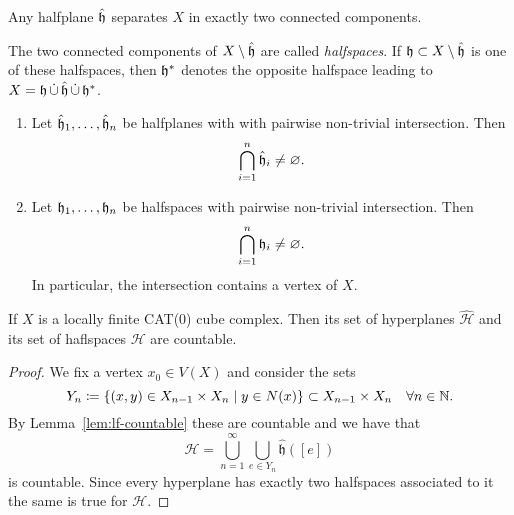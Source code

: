 \begin{thm}
  Any halfplane \(\mathfrak{\hat h}\) separates \(X\) in exactly two connected components.
\end{thm}

\begin{defin}
  The two connected components of \(X \setminus \mathfrak{\hat h}\) are called \emph{halfspaces}. If \(\mathfrak{h} \subset X \setminus \mathfrak{\hat h}\) is one of these halfspaces, then \(\mathfrak{h}^\ast\) denotes the opposite halfspace leading to \(X = \mathfrak{h}\, \dot \cup\, \mathfrak{\hat h}\, \dot \cup\, \mathfrak{h}^\ast \).
\end{defin}

\begin{thm}
  \begin{enumerate}
  \item Let \(\mathfrak{\hat h}_1, \dots, \mathfrak{\hat h}_n\) be halfplanes with with pairwise non-trivial intersection. Then
    \begin{align*}
      \bigcap_{i=1}^n \mathfrak{\hat h}_i \neq \varnothing.
    \end{align*}
  \item Let \(\mathfrak{h}_1, \dots, \mathfrak{h}_n\) be halfspaces with pairwise non-trivial intersection. Then
    \begin{align*}
      \bigcap_{i=1}^n \mathfrak{h}_i \neq \varnothing.
    \end{align*}
    In particular, the intersection contains a vertex of \(X\).
  \end{enumerate}
\end{thm}


\begin{cor}
  If \(X\) is a locally finite CAT(0) cube complex. Then its set of hyperplanes \(\mathcal{\hat H}\) and its set of haflspaces \(\mathcal{H}\) are countable.
\end{cor}

\begin{proof}
  We fix a vertex \(x_0 \in V(X)\) and consider the sets
  \[
    Y_n \coloneqq \{(x,y) \in X_{n-1} \times X_{n} \mid y \in N(x)\} \subset X_{n-1} \times X_n \quad \forall n \in \mathbb{N}.
  \]
  By Lemma~\ref{lem:lf-countable} these are countable and we have that
  \[
    \mathcal{\hat H} = \bigcup_{n=1}^\infty \bigcup_{e \in Y_n} \mathfrak{\hat h}([e])
  \]
  is countable. Since every hyperplane has exactly two halfspaces associated to it the same is true for \(\mathcal{H}\).
\end{proof}

